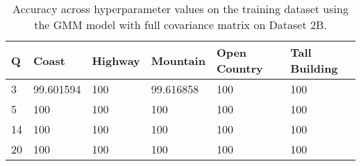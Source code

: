 \begin{table}[H]
\centering
\begin{tabular}{l l l l l l}
\hline
\hline
\textbf{Q} & \textbf{Coast} & \textbf{Highway} & \textbf{Mountain} & \textbf{Open Country} & \textbf{Tall Building} \\
\hline
\hline
3 & 99.601594 & 100 & 99.616858 & 100 & 100 \\
5 & 100 &  100 &  100 &  100 &  100 \\
14 & 100 & 100 & 100 & 100 & 100 \\
20 & 100 & 100 & 100 & 100 & 100 \\
\hline
\end{tabular}
\caption{Accuracy across hyperparameter values on the training dataset using the GMM model with full covariance matrix on Dataset 2B.}
\label{tab:1b_full}
\end{table}
